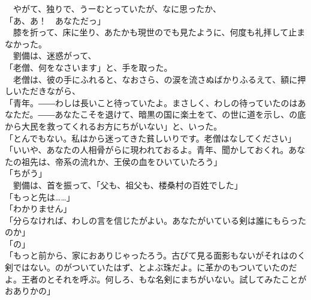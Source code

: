 \documentclass[
  paper=a5,
  fontsize=10pt,
  jafontsize=9.5pt,
  tate,                  %
  open_bracket_pos=nibu, %
]{jlreq}
\begin{document}
　やがて、独りで、うーむとっていたが、なに思ったか、\\


「あ、あ！　あなただっ」\\


　膝を折って、床に坐り、あたかも現世のでも見たように、何度も礼拝して止まなかった。\\


　劉備は、迷惑がって、\\


「老僧、何をなさいます」と、手を取った。\\


　老僧は、彼の手にふれると、なおさら、の涙を流さぬばかりふるえて、額に押しいただきながら、\\


「青年。――わしは長いこと待っていたよ。まさしく、わしの待っていたのはあなただ。――あなたこそを退けて、暗黒の国に楽土をて、の世に道を示し、の底から大民を救ってくれるお方にちがいない」と、いった。\\


「とんでもない。私はから迷ってきた貧しいりです。老僧はなしてください」\\


「いいや、あなたの人相骨がらに現われておるよ。青年、聞かしておくれ。あなたの祖先は、帝系の流れか、王侯の血をひいていたろう」\\


「ちがう」\\


　劉備は、首を振って、「父も、祖父も、楼桑村の百姓でした」\\


「もっと先は……」\\


「わかりません」\\


「分らなければ、わしの言を信じたがよい。あなたがいている剣は誰にもらったのか」\\


「の」\\


「もっと前から、家におありじゃったろう。古びて見る面影もないがそれはのく剣ではない。のがついていたはず、とよぶ珠だよ。に革かのもついていたのだよ。王者のとそれを呼ぶ。何しろ、もな名剣にまちがいない。試してみたことがおありかの」\\
\end{document}
